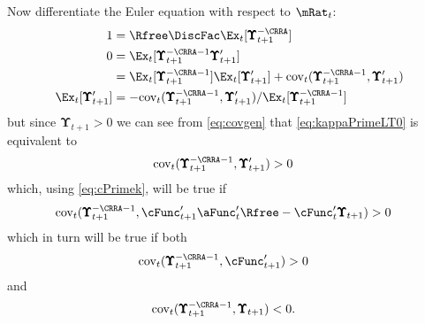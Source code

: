 \documentclass[BufferStockTheory]{subfiles}
\begin{document}
Now differentiate the Euler equation with respect to $\mRat_{t}$:
\begin{equation}\begin{gathered}\begin{aligned}
  1  & = \Rfree \DiscFac \Ex_{t}[ \pmb{\Upsilon}_{t+1}^{-\CRRA}] \notag
  \\ 0  & = \Ex_{t}[\pmb{\Upsilon}_{t+1}^{-\CRRA-1} \pmb{\Upsilon}_{t+1}^{\prime}] \notag
  \\  & = \Ex_{t}[\pmb{\Upsilon}_{t+1}^{-\CRRA-1}]\Ex_{t}[\pmb{\Upsilon}_{t+1}^{\prime}]+\mbox{cov}_{t}(\pmb{\Upsilon}_{t+1}^{-\CRRA-1},\pmb{\Upsilon}_{t+1}^{\prime}) \notag
  \\ \Ex_{t}[\pmb{\Upsilon}_{t+1}^{\prime}]  & = -\mbox{cov}_{t}(\pmb{\Upsilon}_{t+1}^{-\CRRA-1},\pmb{\Upsilon}_{t+1}^{\prime})/\Ex_{t}[\pmb{\Upsilon}_{t+1}^{-\CRRA-1}] \label{eq:covgen}
\end{aligned}\end{gathered}\end{equation}
but since $\pmb{\Upsilon}_{t+1} > 0$ we can see from \eqref{eq:covgen} that \eqref{eq:kappaPrimeLT0} is equivalent to
\begin{equation}\begin{gathered}\begin{aligned}
  \mbox{cov}_{t}(\pmb{\Upsilon}_{t+1}^{-\CRRA-1},\pmb{\Upsilon}_{t+1}^{\prime})  & > 0 \nonumber
\end{aligned}\end{gathered}\end{equation}
which, using \eqref{eq:cPrimek}, will be true if
\begin{equation}\begin{gathered}\begin{aligned}
  \mbox{cov}_{t}(\pmb{\Upsilon}_{t+1}^{-\CRRA-1},\cFunc^{\prime}_{t+1}\aFunc^{\prime}_{t}\Rfree - \cFunc^{\prime}_{t}\pmb{\Upsilon}_{t+1})  & > 0 \notag
\end{aligned}\end{gathered}\end{equation}
which in turn will be true if both
\begin{equation}\begin{gathered}\begin{aligned}
  \mbox{cov}_{t}(\pmb{\Upsilon}_{t+1}^{-\CRRA-1},\cFunc^{\prime}_{t+1} )  & > 0 \notag
\end{aligned}\end{gathered}\end{equation}
and
\begin{align*}
  \mbox{cov}_{t}(\pmb{\Upsilon}_{t+1}^{-\CRRA-1},\pmb{\Upsilon}_{t+1})  & < 0. \notag
\end{align*}
\end{document}
